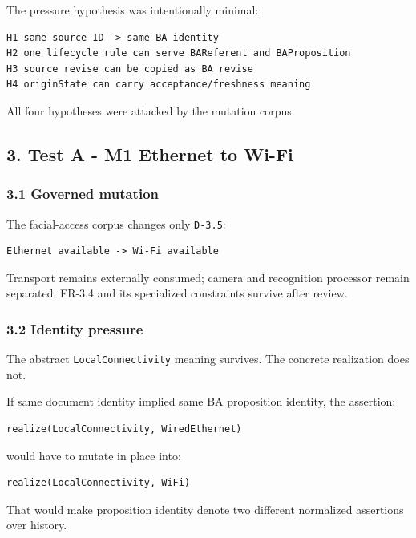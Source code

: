 \documentclass[11pt,a4paper]{article}
\begin{document}
The pressure hypothesis was intentionally minimal:

\begin{verbatim}
H1 same source ID -> same BA identity
H2 one lifecycle rule can serve BAReferent and BAProposition
H3 source revise can be copied as BA revise
H4 originState can carry acceptance/freshness meaning
\end{verbatim}

All four hypotheses were attacked by the mutation corpus.

\subsection{3. Test A - M1 Ethernet to
Wi-Fi}\label{test-a---m1-ethernet-to-wi-fi}

\subsubsection{3.1 Governed mutation}\label{governed-mutation}

The facial-access corpus changes only \texttt{D-3.5}:

\begin{verbatim}
Ethernet available -> Wi-Fi available
\end{verbatim}

Transport remains externally consumed; camera and recognition processor
remain separated; FR-3.4 and its specialized constraints survive after
review.

\subsubsection{3.2 Identity pressure}\label{identity-pressure}

The abstract \texttt{LocalConnectivity} meaning survives. The concrete
realization does not.

If same document identity implied same BA proposition identity, the
assertion:

\begin{verbatim}
realize(LocalConnectivity, WiredEthernet)
\end{verbatim}

would have to mutate in place into:

\begin{verbatim}
realize(LocalConnectivity, WiFi)
\end{verbatim}

That would make proposition identity denote two different normalized
assertions over history.
\end{document}
